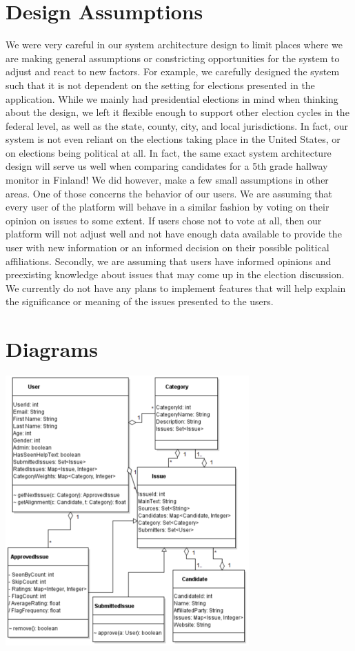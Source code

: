 \documentclass[11pt]{article}
\begin{document}
\section{Design Assumptions}
\vspace{-10pt}
We were very careful in our system architecture design to limit places where we are making general assumptions or constricting opportunities for the system to adjust and react to new factors. For example, we carefully designed the system such that it is not dependent on the setting for elections presented in the application. While we mainly had presidential elections in mind when thinking about the design, we left it flexible enough to support other election cycles in the federal level, as well as the state, county, city, and local jurisdictions. In fact, our system is not even reliant on the elections taking place in the United States, or on elections being political at all. In fact, the same exact system architecture design will serve us well when comparing candidates for a 5th grade hallway monitor in Finland! We did however, make a few small assumptions in other areas. One of those concerns the behavior of our users. We are assuming that every user of the platform will behave in a similar fashion by voting on their opinion on issues to some extent. If users chose not to vote at all, then our platform will not adjust well and not have enough data available to provide the user with new information or an informed decision on their possible political affiliations. Secondly, we are assuming that users have informed opinions and preexisting knowledge about issues that may come up in the election discussion. We currently do not have any plans to implement features that will help explain the significance or meaning of the issues presented to the users.

\vspace{-16pt}

\section{Diagrams}

\begin{centering}
\includegraphics[width = 0.70\textwidth]{uml_diagram.png}

\end{centering}
\end{document}
